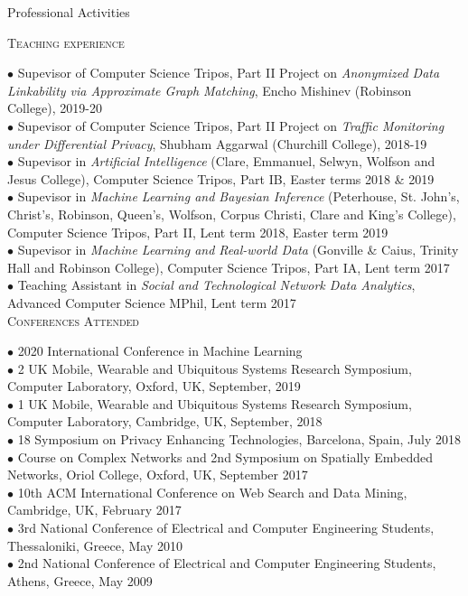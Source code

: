 \documentclass[11pt]{resume}
\begin{document}
\begin{category}{Professional Activities} 

\citemnobullet 
\textsc{Teaching experience}

{$\bullet$  Supevisor of Computer Science Tripos, Part II Project on \emph{Anonymized Data Linkability via Approximate Graph Matching}, Encho Mishinev (Robinson College), 2019-20}\\
{$\bullet$  Supevisor of Computer Science Tripos, Part II Project on \emph{Traffic Monitoring under Differential Privacy}, Shubham Aggarwal (Churchill College), 2018-19}\\
{$\bullet$  Supevisor in \emph{Artificial Intelligence} (Clare, Emmanuel, Selwyn, Wolfson and Jesus College), Computer Science Tripos, Part IB, Easter terms 2018 \& 2019}\\
{$\bullet$  Supevisor in \emph{Machine Learning and Bayesian Inference} (Peterhouse, St. John's, Christ's, Robinson, Queen's, Wolfson, Corpus Christi, Clare and King's College), Computer Science Tripos, Part II, Lent term 2018, Easter term 2019}\\
{$\bullet$  Supevisor in \emph{Machine Learning and Real-world Data} (Gonville \& Caius, Trinity Hall and Robinson College), Computer Science Tripos, Part IA, Lent term 2017}\\
{$\bullet$ Teaching Assistant in \emph{Social and Technological Network Data Analytics}, Advanced Computer Science MPhil, Lent term 2017}\\


\citemnobullet 
\textsc{Conferences Attended}

$\bullet$ 2020 International Conference in Machine Learning\\
$\bullet$ 2 UK Mobile, Wearable and Ubiquitous Systems Research Symposium, Computer Laboratory, Oxford, UK, September, 2019\\
$\bullet$ 1 UK Mobile, Wearable and Ubiquitous Systems Research Symposium, Computer Laboratory, Cambridge, UK, September, 2018\\
$\bullet$ 18 Symposium on Privacy Enhancing Technologies, Barcelona, Spain, July 2018\\
$\bullet$ Course on Complex Networks and 2nd Symposium on Spatially Embedded Networks,  Oriol College, Oxford, UK, September 2017\\
$\bullet$ 10th ACM International Conference on Web Search and Data Mining, Cambridge, UK, February 2017\\
$\bullet$ 3rd National Conference of Electrical and Computer Engineering Students, Thessaloniki, Greece, May 2010\\
$\bullet$ 2nd National Conference of Electrical and Computer Engineering Students, Athens, Greece, May 2009 \\


\end{category}
\end{document}
